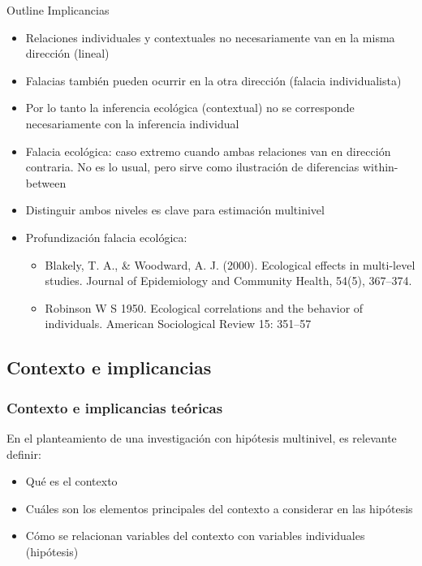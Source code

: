 \documentclass[]{beamer} %
\begin{document}
\begin{frame}[allowframebreaks]{Outline}
	Implicancias
			\begin{itemize}%
				\item Relaciones individuales y contextuales no necesariamente van en la misma dirección (lineal)
				\item Falacias también pueden ocurrir en la otra dirección (falacia individualista)
				\item  Por lo tanto la inferencia ecológica (contextual) no se corresponde necesariamente con la inferencia individual
				\item Falacia ecológica: caso extremo cuando ambas relaciones van en dirección contraria. No es lo usual, pero sirve como ilustración de diferencias within-between
				\item Distinguir ambos niveles es clave para estimación multinivel

			\framebreak

				\item Profundización falacia ecológica:
						\begin{itemize}%
							\item Blakely, T. A., \& Woodward, A. J. (2000). Ecological effects in multi-level studies. Journal of Epidemiology and Community Health, 54(5), 367–374.

							\item Robinson W S 1950. Ecological correlations and the behavior of individuals. American Sociological
							Review 15: 351–57
						\end{itemize}
			\end{itemize}

	\end{frame}

\subsection{Contexto e implicancias}

	\begin{frame}%
		\frametitle{Contexto e implicancias teóricas}
		En el planteamiento de una investigación con hipótesis multinivel, es relevante definir:
		\begin{itemize}%
			\item Qué es el contexto
			\item Cuáles son los elementos principales del contexto a considerar en las hipótesis
			\item Cómo se relacionan variables del contexto con variables individuales (hipótesis)
		\end{itemize}
	\end{frame}
\end{document}
